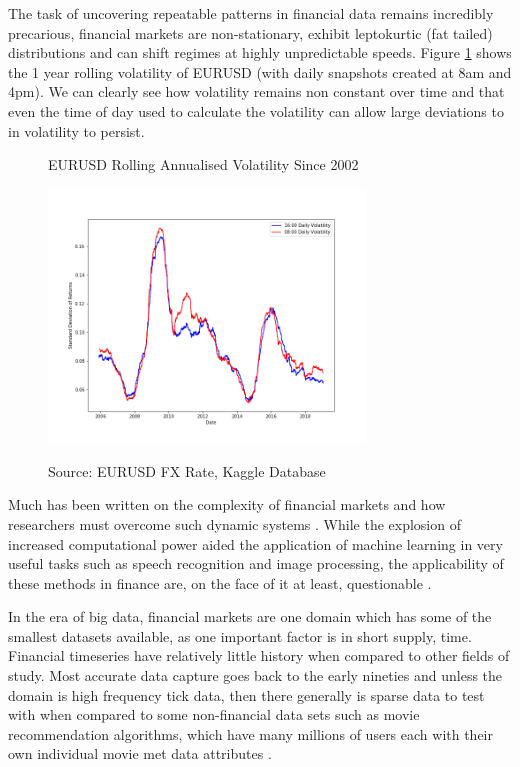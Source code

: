 \documentclass[11pt, a4paper]{article}
\begin{document}
The task of uncovering repeatable patterns in financial data remains incredibly precarious, financial markets are non-stationary, exhibit leptokurtic (fat tailed) distributions and can shift regimes at highly unpredictable speeds. Figure \ref{fig:eurvol} shows the 1 year rolling volatility of EURUSD (with daily snapshots created at 8am and 4pm). We can clearly see how volatility remains non constant over time and that even the time of day used to calculate the volatility can allow large deviations to in volatility to persist.
\begin{figure}[h]
    \centering
  \caption{EURUSD Rolling Annualised Volatility Since 2002}

    \includegraphics[width=0.75\textwidth]{EURUSDRollingVol}
    \label{fig:eurvol}
\caption*{Source: EURUSD FX Rate, Kaggle Database}
\end{figure}
\newline
Much has been written on the complexity of financial markets and how researchers must overcome such dynamic systems \cite{Lebaron1994}. While the explosion of increased computational power aided the application of machine learning in very useful tasks such as speech recognition and image processing, the applicability of these methods in finance are, on the face of it at least, questionable \cite{Bailey2013}. 
\par
In the era of big data, financial markets are one domain which has some of the smallest datasets available, as one important factor is in short supply, time. Financial timeseries have relatively little history when compared to other fields of study. Most accurate data capture goes back to the early nineties and unless the domain is high frequency tick data, then there generally is sparse data to test with when compared to some non-financial data sets such as movie recommendation algorithms, which have many millions of users each with their own individual movie met data attributes \cite{Portugal2018}. 
\end{document}

